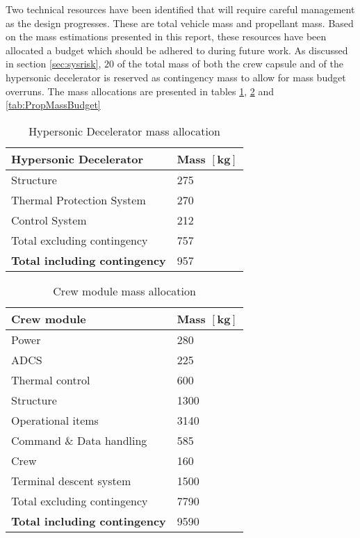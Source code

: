 Two technical resources have been identified that will require careful management as the design progresses. These are total vehicle mass and propellant mass. Based on the mass estimations presented in this report, these resources have been allocated a budget which should be adhered to during future work. As discussed in section \ref{sec:sysrisk},  $20$ of the total mass of both the crew capsule and of the hypersonic decelerator is reserved as contingency mass to allow for mass budget overruns. The mass allocations are presented in tables \ref{tab:HDMassBudget},  \ref{tab:CMMassBudget} and \ref{tab:PropMassBudget} 

\begin{table}[h]
	\centering
	\caption{Hypersonic Decelerator mass allocation}
	\label{tab:HDMassBudget}
	\begin{tabular}{|l|l|} \hline
		\textbf {Hypersonic Decelerator}             & \textbf{Mass $\mathbf{[kg]}$ } \\ \hline \hline
		Structure          &		 275       \\ \hline
		Thermal Protection System &		  270      \\ \hline
		Control System            		   &  212      \\ \hline \hline
		Total excluding contingency              	   &  757     \\ \hline
		\textbf {Total including contingency}                 &  957      \\ \hline
	\end{tabular}
\end{table}

\begin{table}[h]
	\centering
	\caption{Crew module mass allocation}
	\label{tab:CMMassBudget}
	\begin{tabular}{|l|l|} \hline
		\textbf {Crew module}             & \textbf{Mass $\mathbf{[kg]}$ } \\ \hline \hline
		Power        &		 280       \\ \hline
		ADCS &		  225      \\ \hline
		Thermal control & 600\\ \hline
		Structure & 1300\\ \hline
		Operational items & 3140\\ \hline
		Command \& Data handling & 585 \\ \hline
		Crew & 160 \\ \hline
		Terminal descent system           		   &  1500      \\ \hline \hline
		Total excluding contingency              	   &  7790     \\ \hline
		\textbf {Total including contingency}                 &  9590      \\ \hline
	\end{tabular}
\end{table}

